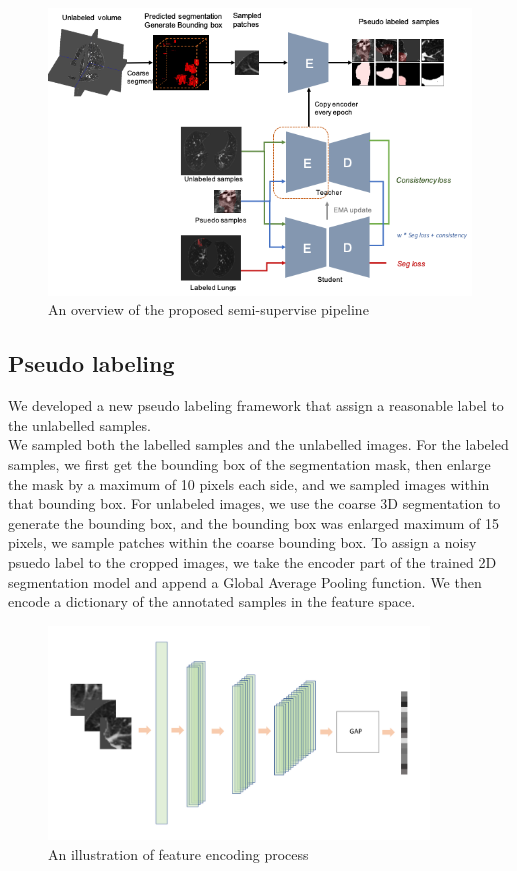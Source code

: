 \begin{figure}[h]
	\includegraphics[width=\textwidth]{img/Net_arch/semi-arch}
	\caption{An overview of the proposed semi-supervise pipeline}
\end{figure}

\subsection{Pseudo labeling}
We developed a new pseudo labeling framework that assign a reasonable label to the unlabelled samples.\\

We sampled both the labelled samples and the unlabelled images. For the labeled samples, we first get the bounding box of the segmentation mask, then enlarge the mask by a maximum of 10 pixels each side, and we sampled images within that bounding box.
For unlabeled images, we use the coarse 3D segmentation to generate the bounding box, and the bounding box was enlarged maximum of 15 pixels, we sample patches within the coarse bounding box.
To assign a noisy psuedo label to the cropped images, we take the encoder part of the trained 2D segmentation model and append a Global Average Pooling function. We then encode a dictionary of the annotated samples in the feature space.\\
\begin{figure}
	\centering
	\includegraphics[width=0.9\textwidth]{img/semi-experiment/latent-space}
	\caption{An illustration of feature encoding process}
\end{figure}

